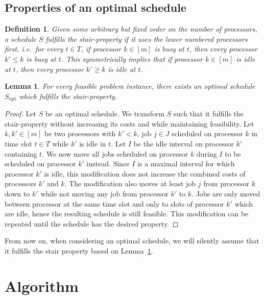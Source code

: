 \documentclass[a4paper]{article}
\DeclareMathOperator{\opt}{opt}
\newtheorem{lemma}[theorem]{Lemma}
\newtheorem{definition}[theorem]{Definition}
\begin{document}
\subsection{Properties of an optimal schedule}
\begin{definition}\label{def:stair_property}
  Given some arbitrary but fixed order on the number of processors, a schedule $S$ fulfills the \emph{stair-property} if it uses the lower numbered processors first, i.e.\ for every $t \in T$, if processor $k \in [m]$ is busy at $t$, then every processor $k' \leq k$ is busy at $t$.
  This symmetrically implies that if processor $k \in [m]$ is idle at $t$, then every processor $k' \geq k$ is idle at $t$.
\end{definition}

\begin{lemma}\label{lemma:stair_property_opt}
  For every feasible problem instance, there exists an optimal schedule $S_{\opt}$ which fulfills the stair-property.
\end{lemma}
\begin{proof}
  Let $S$ be an optimal schedule.
  We transform $S$ such that it fulfills the stair-property without increasing its costs and while maintaining feasibility.
  Let $k, k' \in [m]$ be two processors with $k' < k$, job $j \in J$ scheduled on processor $k$ in time slot $t \in T$ while $k'$ is idle in $t$.
  Let $I$ be the idle interval on processor $k'$ containing $t$.
  We now move all jobs scheduled on processor $k$ during $I$ to be scheduled on processor $k'$ instead.
  Since $I$ is a maximal interval for which processor $k'$ is idle, this modification does not increase the combined costs of processors $k'$ and $k$.
  The modification also moves at least job $j$ from processor $k$ down to $k'$ while not moving any job from processor $k'$ to $k$.
  Jobs are only moved between processor at the same time slot and only to slots of processor $k'$ which are idle, hence the resulting schedule is still feasible.
  This modification can be repeated until the schedule has the desired property.
\end{proof}
From now on, when considering an optimal schedule, we will silently assume that it fulfills the stair property based on Lemma~\ref{lemma:stair_property_opt}.

\section{Algorithm}
\end{document}
